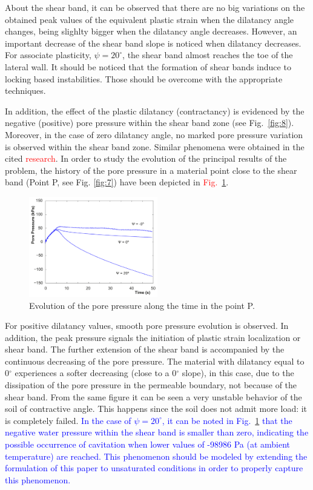 \documentclass[twocolumn]{svjour3}          %
\begin{document}
About the shear band, it can be observed that there are no big  variations on  the obtained peak values of the equivalent plastic strain when the dilatancy angle changes, being slighlty bigger when the dilatancy angle decreases. However, an important decrease of the shear band slope is noticed when dilatancy decreases. For associate plasticity, $\psi=20^\circ$, the shear band almost reaches the toe of the lateral wall. It should be noticed that the formation of shear bands induce to locking based instabilities. Those should be overcome with the appropriate techniques.

In addition, the effect of the plastic dilatancy (contractancy) is evidenced by the negative (positive) pore pressure within the shear band zone (see Fig.~\ref{fig:8}).  Moreover, in the case of zero dilatancy angle, no marked pore pressure variation is observed within the shear band zone. Similar phenomena were obtained in the cited \textcolor{red}{research}. In order to study the evolution of the principal results of the problem, the history of the pore pressure  in a material point close to the shear band (Point P, see Fig. \ref{fig:7}) have been depicted in  \textcolor{red}{Fig.}~\ref{fig:13}.

\begin{figure}
  \includegraphics[width=0.5\textwidth]{Fig/pressure.pdf}
\caption{Evolution of the pore pressure along the time in the point P.}
\label{fig:13}      
\end{figure}

For positive dilatancy values, smooth pore pressure evolution is observed. In addition, the peak pressure signals the initiation of plastic strain localization or shear band. The further extension of the shear band is accompanied by the continuous decreasing of the pore pressure. The material with dilatancy equal to 0$^\circ$ experiences a softer decreasing (close to a 0$^\circ$ slope), in this case, due to the dissipation of the pore pressure in the permeable boundary, not because of the shear band. From the same figure it can be seen a very unstable behavior of the soil of contractive angle. This happens since the soil does not admit more load: it is completely failed. \textcolor{blue}{In the case of $\psi=20^\circ$, it can be noted in Fig.~\ref{fig:13}  that the negative water pressure within the shear band is smaller than zero, indicating the possible occurrence of cavitation when lower values of -98986 Pa (at ambient temperature) are reached. This phenomenon should be modeled by extending the formulation of this paper to unsaturated conditions in order to properly capture this phenomenon.}
\end{document}
